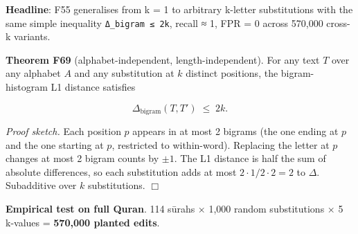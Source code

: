\documentclass[
]{article}
\begin{document}
\textbf{Headline}: F55 generalises from k = 1 to arbitrary k-letter
substitutions with the same simple inequality \texttt{Δ\_bigram\ ≤\ 2k},
recall ≈ 1, FPR = 0 across 570,000 cross-k variants.

\textbf{Theorem F69} (alphabet-independent, length-independent). For any
text \(T\) over any alphabet \(A\) and any substitution at \(k\)
distinct positions, the bigram-histogram L1 distance satisfies

\[\Delta_{\text{bigram}}(T, T') \;\leq\; 2k.\]

\emph{Proof sketch.} Each position \(p\) appears in at most 2 bigrams
(the one ending at \(p\) and the one starting at \(p\), restricted to
within-word). Replacing the letter at \(p\) changes at most 2 bigram
counts by \(\pm 1\). The L1 distance is half the sum of absolute
differences, so each substitution adds at most
\(2 \cdot 1 / 2 \cdot 2 = 2\) to \(\Delta\). Subadditive over \(k\)
substitutions. \(\Box\)

\textbf{Empirical test on full Quran}. 114 sūrahs × 1,000 random
substitutions × 5 k-values = \textbf{570,000 planted edits}.
\end{document}
